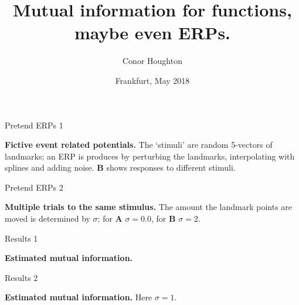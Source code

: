 \documentclass{beamer}
\title[Mutual information for functions.]{Mutual information for functions, maybe even ERPs.}
\author{Conor Houghton}
\institute{CS, U Bristol}
\date{Frankfurt, May 2018}
\begin{document}
\maketitle


\begin{frame}{Pretend ERPs 1}
\color{reddish}
\begin{center}

\end{center}
\color{black} \textbf{Fictive event related potentials.} The
\lq{}stimuli\rq{} are random 5-vectors of landmarks; an ERP is
produces by perturbing the landmarks, interpolating with splines and
adding noise. \textbf{B} shows responses to different stimuli.
\color{black}
\end{frame}


\begin{frame}{Pretend ERPs 2}
\color{reddish}
\begin{center}

\end{center}
\color{black} \textbf{Multiple trials to the same stimulus.} The
amount the landmark points are moved is determined by $\sigma$; for
\textbf{A} $\sigma=0.0$, for \textbf{B} $\sigma=2$.  \color{black}
\end{frame}



\begin{frame}{Results 1}
\color{reddish}
\begin{center}

\color{black} \textbf{Estimated mutual information.} \color{black}
\end{center}
\end{frame}


\begin{frame}{Results 2}
\color{reddish}
\begin{center}
  
\color{black} \textbf{Estimated mutual information.} Here $\sigma=1$. \color{black}
\end{center}
\end{frame}


\end{document}
